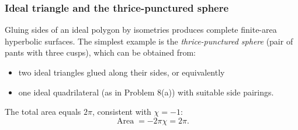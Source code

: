 \documentclass[12pt,a4paper]{article}
\DeclareMathOperator{\Area}{Area}
\theoremstyle{plain}
\theoremstyle{definition}      %
\begin{document}
	
	\subsubsection*{Ideal triangle and the thrice-punctured sphere}
	Gluing sides of an ideal polygon by isometries produces complete finite-area hyperbolic surfaces.
	The simplest example is the \emph{thrice-punctured sphere} (pair of pants with three cusps), which can be obtained from:
	\begin{itemize}
		\item two ideal triangles glued along their sides, or equivalently
		\item one ideal quadrilateral (as in Problem 8(a)) with suitable side pairings.
	\end{itemize}
	The total area equals $2\pi$, consistent with $\chi=-1$:
	\[
	\Area = -2\pi\chi = 2\pi.
	\]
	
\end{document}
